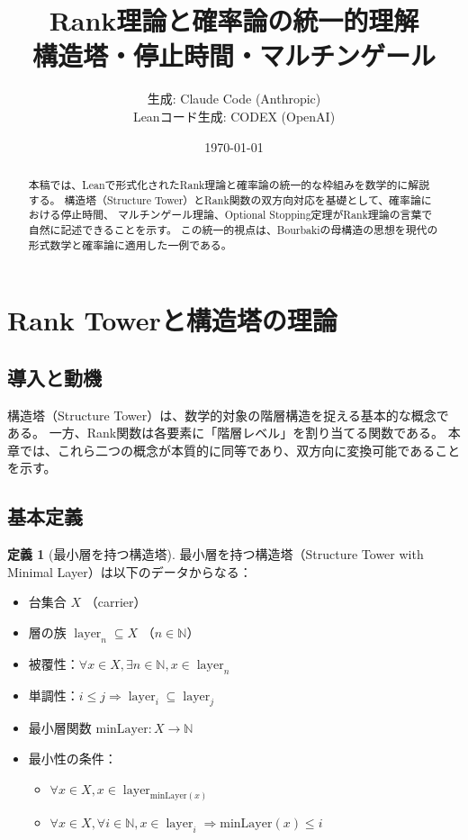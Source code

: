 \documentclass[a4paper,12pt]{ltjsarticle}
\title{Rank理論と確率論の統一的理解\\
{\large 構造塔・停止時間・マルチンゲール}}
\author{%
  生成: Claude Code (Anthropic)\\
  \small Leanコード生成: CODEX (OpenAI)
}
\date{\today}
\theoremstyle{definition}
\newtheorem{definition}{定義}[section]
\newcommand{\N}{\mathbb{N}}
\newcommand{\minLayer}{\mathrm{minLayer}}
\DeclareMathOperator{\layer}{layer}
\begin{document}
\maketitle

\begin{abstract}
本稿では、Leanで形式化されたRank理論と確率論の統一的な枠組みを数学的に解説する。
構造塔（Structure Tower）とRank関数の双方向対応を基礎として、確率論における停止時間、
マルチンゲール理論、Optional Stopping定理がRank理論の言葉で自然に記述できることを示す。
この統一的視点は、Bourbakiの母構造の思想を現代の形式数学と確率論に適用した一例である。
\end{abstract}

\tableofcontents
\newpage

\section{Rank Towerと構造塔の理論}

\subsection{導入と動機}

構造塔（Structure Tower）は、数学的対象の階層構造を捉える基本的な概念である。
一方、Rank関数は各要素に「階層レベル」を割り当てる関数である。
本章では、これら二つの概念が本質的に同等であり、双方向に変換可能であることを示す。

\subsection{基本定義}

\begin{definition}[最小層を持つ構造塔]
最小層を持つ構造塔（Structure Tower with Minimal Layer）は以下のデータからなる：
\begin{itemize}
  \item 台集合 $X$ （carrier）
  \item 層の族 $\layer_n \subseteq X$ （$n \in \N$）
  \item 被覆性：$\forall x \in X, \exists n \in \N, x \in \layer_n$
  \item 単調性：$i \leq j \Rightarrow \layer_i \subseteq \layer_j$
  \item 最小層関数 $\minLayer : X \to \N$
  \item 最小性の条件：
    \begin{itemize}
      \item $\forall x \in X, x \in \layer_{\minLayer(x)}$
      \item $\forall x \in X, \forall i \in \N, x \in \layer_i \Rightarrow \minLayer(x) \leq i$
    \end{itemize}
\end{itemize}
\end{definition}
\end{document}
